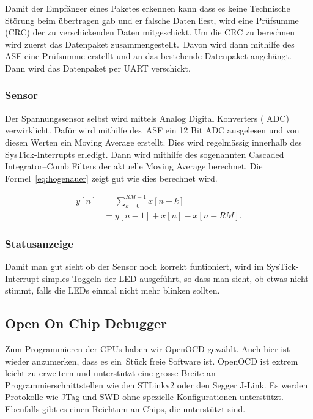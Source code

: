 Damit der  Empf\"anger eines  Paketes erkennen kann  dass es  keine Technische
St\"orung  beim  \"ubertragen  gab  und  er falsche  Daten  liest,  wird  eine
Pr\"ufsumme (CRC)  der zu  verschickenden Daten mitgeschickt.   Um die  CRC zu
berechnen  wird  zuerst  das  Datenpaket  zusammengestellt. Davon  wird  dann
mithilfe des  ASF eine Pr\"ufsumme  erstellt und an das  bestehende Datenpaket
angeh\"angt. Dann wird das Datenpaket per UART verschickt.

\subsubsection{Sensor}
\label{subs:Sensor}

Der  Spannungssensor selbst  wird  mittels Analog  Digital  Konverters (  ADC)
verwirklicht.  Daf\"ur  wird mithilfe des ASF  ein 12 Bit ADC  ausgelesen und
von  diesen Werten  ein Moving  Average  erstellt.  Dies wird regelmässig innerhalb des SysTick-Interrupts erledigt.  Dann wird mithilfe
des sogenannten Cascaded Integrator–Comb Filters der aktuelle Moving Average
berechnet. Die Formel~\ref{eq:hogenauer} zeigt gut wie dies berechnet wird.

\begin{equation}\label{eq:hogenauer}
    \begin{split}
        y[n] &= \sum_{k=0}^{RM-1} x[n-k] \\
             &= y[n-1] + x[n] - x[n-RM].
    \end{split}
\end{equation}

\subsubsection{Statusanzeige}
\label{subs:Statusanzeige}

Damit man  gut sieht  ob der  Sensor noch korrekt  funtioniert, wird im SysTick-Interrupt simples Toggeln der LED ausgeführt, so dass man sieht,
ob etwas nicht stimmt, falls die LEDs einmal nicht mehr blinken sollten.

\subsection{Open On Chip Debugger}

Zum Programmieren der  CPUs haben wir OpenOCD gew\"ahlt. Auch  hier ist wieder
anzumerken, dass es ein St\"uck freie Software ist. OpenOCD ist extrem leicht
zu erweitern und unterst\"utzt eine grosse Breite an Programmierschnittstellen
wie den STLinkv2 oder den Segger J-Link. Es werden Protokolle wie JTag und SWD
ohne spezielle Konfigurationen unterst\"utzt. Ebenfalls gibt es einen Reichtum
an Chips, die unterst\"utzt sind.

